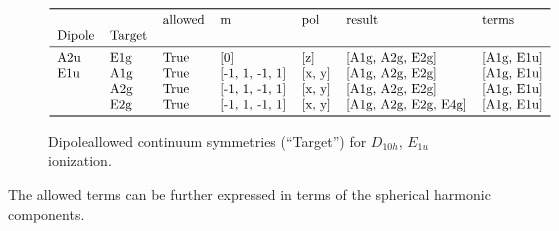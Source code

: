 \documentclass[letterpaper,table,10pt,english]{jupyterBook}
\begin{document}
\begin{figure}[htbp]
\centering
\capstart
\begin{equation*}
\begin{split}\begin{tabular}{lllllll}
\toprule
    &     & allowed &               m &     pol &                result &       terms \\
Dipole & Target &         &                 &         &                       &             \\
\midrule
A2u & E1g &    True &             [0] &     [z] &       [A1g, A2g, E2g] &  [A1g, E1u] \\
E1u & A1g &    True &  [-1, 1, -1, 1] &  [x, y] &       [A1g, A2g, E2g] &  [A1g, E1u] \\
    & A2g &    True &  [-1, 1, -1, 1] &  [x, y] &       [A1g, A2g, E2g] &  [A1g, E1u] \\
    & E2g &    True &  [-1, 1, -1, 1] &  [x, y] &  [A1g, A2g, E2g, E4g] &  [A1g, E1u] \\
\bottomrule
\end{tabular}\end{split}
\end{equation*}\caption{Dipole\sphinxhyphen{}allowed continuum symmetries (“Target”) for \(D_{10h}\), \(E_{1u}\) ionization.}\label{\detokenize{part2/sym-fitting-intro_220423:fig-dipoletermsd10he1u}}\end{figure}

\sphinxAtStartPar
The allowed terms can be further expressed in terms of the spherical harmonic components.
\end{document}
